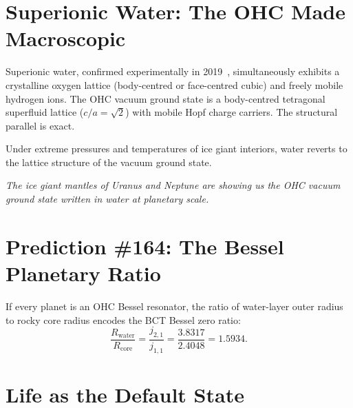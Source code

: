 \documentclass[aps,prl,twocolumn,superscriptaddress,floatfix]{revtex4-2}
\begin{document}
\section{Superionic Water: The OHC Made Macroscopic}

Superionic water, confirmed experimentally in 2019~\cite{Millot2019},
simultaneously exhibits a crystalline oxygen lattice (body-centred or
face-centred cubic) and freely mobile hydrogen ions. The OHC vacuum
ground state is a body-centred tetragonal superfluid lattice
($c/a=\sqrt{2}$) with mobile Hopf charge carriers. The structural
parallel is exact.

Under extreme pressures and temperatures of ice giant interiors,
water reverts to the lattice structure of the vacuum ground state.

\textit{The ice giant mantles of Uranus and Neptune are showing us
the OHC vacuum ground state written in water at planetary scale.}

\section{Prediction \#164: The Bessel Planetary Ratio}

If every planet is an OHC Bessel resonator, the ratio of water-layer
outer radius to rocky core radius encodes the BCT Bessel zero ratio:
\begin{equation}
\frac{R_\mathrm{water}}{R_\mathrm{core}}
= \frac{j_{2,1}}{j_{1,1}}
= \frac{3.8317}{2.4048} = \boxed{1.5934}.
\label{eq:pred164}
\end{equation}

\noindent{}

\section{Life as the Default State}
\end{document}
